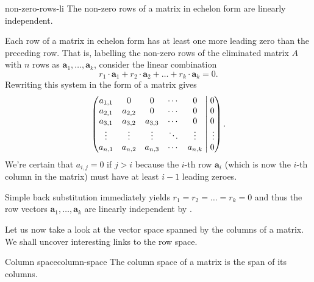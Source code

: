 \begin{lemma}{}{non-zero-rows-li}
 The non-zero rows of a matrix in echelon form are linearly independent.
\end{lemma}
\begin{lemproof}
 Each row of a matrix in echelon form has at least one more leading zero than
 the preceding row. That is, labelling the non-zero rows of the eliminated
 matrix $A$ with $n$ rows as $\mathbf{a}_1,\ldots,\mathbf{a}_k$, consider the
 linear combination
 \[
  r_1 \cdot \mathbf{a}_1 + r_2 \cdot \mathbf{a}_2 + \ldots + r_k \cdot
  \mathbf{a}_k = 0.
 \]
 Rewriting this system in the form of a matrix gives
 \[
  \left(
   \begin{matrix*}[c]
    a_{1,1} & 0 & 0 & \cdots & 0\\
    a_{2,1} & a_{2,2} & 0 & \cdots & 0\\
    a_{3,1} & a_{3,2} & a_{3,3} & \cdots & 0\\
    \vdots & \vdots & \vdots & \ddots & \vdots\\
    a_{n,1} & a_{n,2} & a_{n,3} & \cdots & a_{n,k}
   \end{matrix*}
   \hspace{1mm}
  \right|
  \left.
   \begin{matrix*}[r]
    0\\
    0\\
    0\\
    \vdots\\
    0
   \end{matrix*}
  \right).
 \]
 We're certain that $a_{i,j} = 0$ if $j > i$ because the $i$-th row
 $\mathbf{a}_i$ (which is now the $i$-th column in the matrix) must have at
 least $i - 1$ leading zeroes.

 Simple back substitution immediately yields $r_1 = r_2 = \ldots = r_k = 0$ and
 thus the row vectors $\mathbf{a}_1,\ldots,\mathbf{a}_k$ are linearly
 independent by .
\end{lemproof}

Let us now take a look at the vector space spanned by the columns of a matrix.
We shall uncover interesting links to the row space.

\begin{definition}{Column space}{column-space}
 The column space of a matrix is the span of its columns.
\end{definition}

